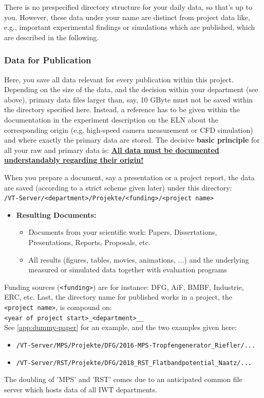 \noindent There is no prespecified directory structure for your daily data, so
that’s up to you. However, these data under your name are distinct from project
data like, e.g., important experimental findings or simulations which are
published, which are described in the following.

\subsubsection{Data for Publication}\label{ssc:data-for-publication}

Here, you save all data relevant for every publication within this project.
Depending on the size of the data, and the decision within your department (see
above), primary data files larger than, say, 10 GByte must not be saved within
the directory specified here. Instead, a reference has to be given within the
documentation in the experiment description on the ELN about the corresponding
origin (e.g. high-speed camera measurement or CFD simulation) and where exactly
the primary data are stored. The decisive \textbf{basic principle} for all your
raw and primary data is:
\textbf{\underline{All data must be documented understandably regarding their origin!}}

When you prepare a document, say a presentation or a project report, the data
are saved (according to a strict scheme given later) under this directory: \\
\texttt{/VT-Server/<department>/Projekte/<funding>/<project name>}
\begin{itemize}
  \item[$\rightarrow$] \textbf{Resulting Documents:}
    \begin{itemize}
      \item Documents from your scientific work: Papers, Dissertations,
            Presentations, Reports, Proposals, etc.
      \item All results (figures, tables, movies, animations, ...) and the
            underlying measured or simulated data together with evaluation
            programs
    \end{itemize}
\end{itemize}
Funding sources (\texttt{<funding>}) are for instance: DFG, AiF, BMBF,
Industrie, ERC, etc. Last, the directory name for published works in a project,
the \texttt{<project name>}, is compound on: \\
\texttt{<year of project start>\_<department>\_<project handle>\_<family name>} \\
See \autoref{app:dummy-paper} for an example, and the two examples given here:
\begin{itemize}
  \item \texttt{/VT-Server/MPS/Projekte/DFG/2016-MPS-Tropfengenerator\_Riefler/...}
  \item \texttt{/VT-Server/RST/Projekte/DFG/2018\_RST\_Flatbandpotential\_Naatz/...}
\end{itemize}
The doubling of 'MPS' and 'RST' comes due to an anticipated common file server
which hosts data of all IWT departments.

